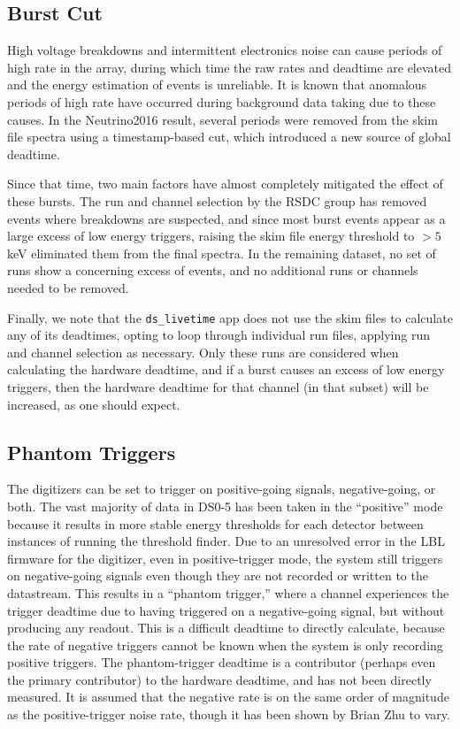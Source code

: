 \documentclass[notitlepage,rmp,aps,10pt]{revtex4-1}
\begin{document}
\subsection{Burst Cut}

High voltage breakdowns and intermittent electronics noise can cause periods of high rate in the array, during which time the raw rates and deadtime are elevated and the energy estimation of events is unreliable.  It is known that anomalous periods of high rate have occurred during background data taking due to these causes.  In the Neutrino2016 \cite{neutrino2016} result, several periods were removed from the skim file spectra using a timestamp-based cut, which introduced a new source of global deadtime.

Since that time, two main factors have almost completely mitigated the effect of these bursts.
The run and channel selection by the RSDC group has removed events where breakdowns are suspected, and since most burst events appear as a large excess of low energy triggers, raising the skim file energy threshold to $>5$ keV eliminated them from the final spectra.
In the remaining dataset, no set of runs show a concerning excess of events, and no additional runs or channels needed to be removed.

Finally, we note that the \texttt{ds\_livetime} app does not use the skim files to calculate any of its deadtimes, opting to loop through individual run files, applying run and channel selection as necessary.
Only these runs are considered when calculating the hardware deadtime, and if a burst causes an excess of low energy triggers, then the hardware deadtime for that channel (in that subset) will be increased, as one should expect.


\subsection{Phantom Triggers} \label{sec:phantoms}

The digitizers can be set to trigger on positive-going signals, negative-going, or both.
The vast majority of data in DS0-5 has been taken in the ``positive'' mode because it results in more stable energy thresholds for each detector between instances of running the threshold finder.
Due to an unresolved error in the LBL firmware for the digitizer, even in positive-trigger mode, the system still triggers on negative-going signals even though they are not recorded or written to the datastream.
This results in a ``phantom trigger,'' where a channel experiences the trigger deadtime due to having triggered on a negative-going signal, but without producing any readout.
This is a difficult deadtime to directly calculate, because the rate of negative triggers cannot be known when the system is only recording positive triggers.
The phantom-trigger deadtime is a contributor (perhaps even the primary contributor) to the hardware deadtime, and has not been directly measured. It is assumed that the negative rate is on the same order of magnitude as the positive-trigger noise rate, though it has been shown by Brian Zhu to vary.
\end{document}
